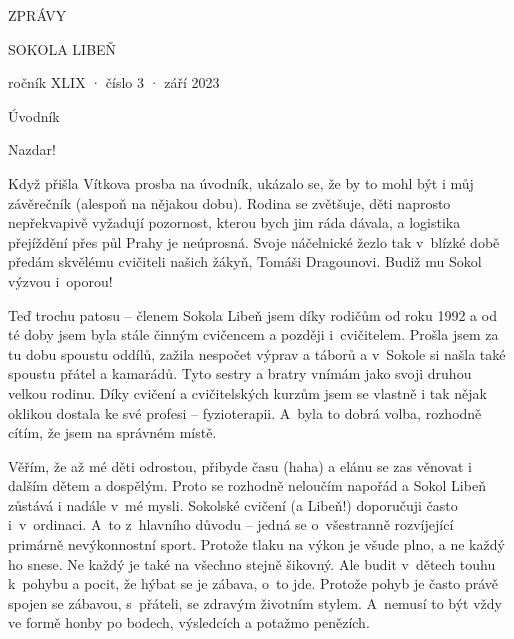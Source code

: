\documentclass[11pt]{article}
\begin{document}
\pagecolor{sokolred}
\color{white}
\begin{center}
\vspace*{\fill}

{\titlesize \fugner ZPRÁVY}

{\titlesize \tyrs SOKOLA LIBEŇ}

\vspace*{1cm}

{\large ročník XLIX · číslo 3 · září 2023}

\vspace*{\fill}
\end{center}

\clearpage
\normalcolor
\nopagecolor
{}

\pagestyle{uvodnik}


{\fontsize{48pt}{57pt} \fugner \color{sokolred} \noindent Úvodník}

\vspace*{12pt}

\noindent
Nazdar!

\vspace*{6pt}

\noindent
Když přišla Vítkova prosba na úvodník, ukázalo se, že by to mohl být i můj závěrečník (alespoň na nějakou dobu). Rodina se zvětšuje, děti naprosto nepřekvapivě vyžadují pozornost, kterou bych jim ráda dávala, a logistika přejíždění přes půl Prahy je neúprosná. Svoje náčelnické žezlo tak v~blízké době předám skvělému cvičiteli našich žákyň, Tomáši Dragounovi. Budiž mu Sokol výzvou i~oporou!

Teď trochu patosu –⁠ členem Sokola Libeň jsem díky rodičům od roku 1992 a od té doby jsem byla stále činným cvičencem a později i~cvičitelem. Prošla jsem za tu dobu spoustu oddílů, zažila nespočet výprav a táborů a v~Sokole si našla také spoustu přátel a kamarádů. Tyto sestry a bratry vnímám jako svoji druhou velkou rodinu. Díky cvičení a cvičitelských kurzům jsem se vlastně i tak nějak oklikou dostala ke své profesi –⁠ fyzioterapii. A~byla to dobrá volba, rozhodně cítím, že jsem na správném místě.

Věřím, že až mé děti odrostou, přibyde času (haha) a elánu se zas věnovat i dalším dětem a dospělým. Proto se rozhodně neloučím napořád a Sokol Libeň zůstává i nadále v~mé mysli. Sokolské cvičení (a Libeň!) doporučuji často i~v~ordinaci. A~to z~hlavního důvodu –⁠ jedná se o~všestranně rozvíjející primárně nevýkonnostní sport. Protože tlaku na výkon je všude plno, a ne každý ho snese. Ne každý je také na všechno stejně šikovný. Ale budit v~dětech touhu k~pohybu a pocit, že hýbat se je zábava, o~to jde. Protože pohyb je často právě spojen se zábavou, s~přáteli, se zdravým životním stylem. A~nemusí to být vždy ve formě honby po bodech, výsledcích a potažmo penězích.
\end{document}
